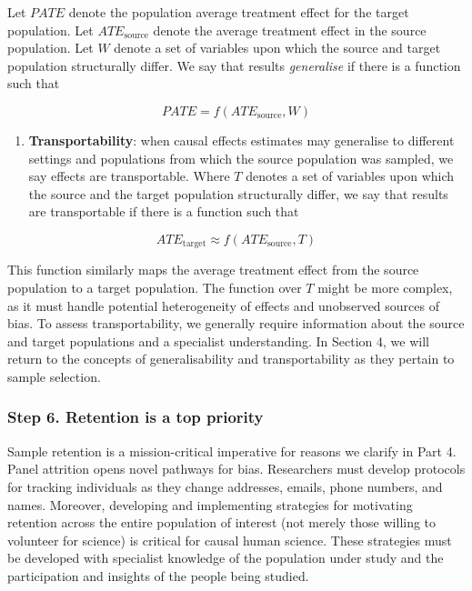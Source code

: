 \documentclass[
  singlecolumn]{article}
\providecommand{\tightlist}{%
  \setlength{\itemsep}{0pt}\setlength{\parskip}{0pt}}\usepackage{longtable,booktabs,array}
\begin{document}
Let \(PATE\) denote the population average treatment effect for the
target population. Let \(ATE_{\text{source}}\) denote the average
treatment effect in the source population. Let \(W\) denote a set of
variables upon which the source and target population structurally
differ. We say that results \emph{generalise} if there is a function
such that

\[PATE =  f(ATE_{\text{source}}, W)\]

\begin{enumerate}
\def\labelenumi{\arabic{enumi}.}
\setcounter{enumi}{3}
\tightlist
\item
  \textbf{Transportability}: when causal effects estimates may
  generalise to different settings and populations from which the source
  population was sampled, we say effects are transportable. Where \(T\)
  denotes a set of variables upon which the source and the target
  population structurally differ, we say that results are transportable
  if there is a function such that
\end{enumerate}

\[ATE_{\text{target}} \approx f(ATE_{\text{source}}, T)\]

This function similarly maps the average treatment effect from the
source population to a target population. The function over \(T\) might
be more complex, as it must handle potential heterogeneity of effects
and unobserved sources of bias. To assess transportability, we generally
require information about the source and target populations and a
specialist understanding. In Section 4, we will return to the concepts
of generalisability and transportability as they pertain to sample
selection.

\hypertarget{step-6.-retention-is-a-top-priority}{%
\subsubsection{Step 6. Retention is a top
priority}\label{step-6.-retention-is-a-top-priority}}

Sample retention is a mission-critical imperative for reasons we clarify
in Part 4. Panel attrition opens novel pathways for bias. Researchers
must develop protocols for tracking individuals as they change
addresses, emails, phone numbers, and names. Moreover, developing and
implementing strategies for motivating retention across the entire
population of interest (not merely those willing to volunteer for
science) is critical for causal human science. These strategies must be
developed with specialist knowledge of the population under study and
the participation and insights of the people being studied.
\end{document}
